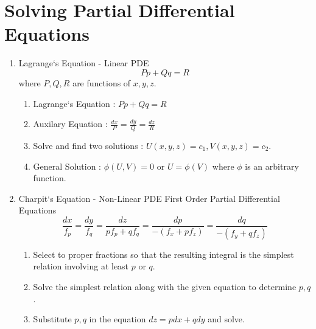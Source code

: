 \section{Solving Partial Differential Equations}
\begin{enumerate}
	\item Lagrange`s Equation - Linear PDE
	\begin{equation}
		Pp + Qq = R
	\end{equation}
		where $P,Q,R$ are functions of $x,y,z$.
	\begin{enumerate}
		\item Lagrange`s Equation : $Pp + Qq = R$
		\item Auxilary Equation : $\frac{dx}{P} = \frac{dy}{Q} = \frac{dz}{R}$
		\item Solve and find two solutions : $U(x,y,z) = c_1, V(x,y,z) = c_2$.
		\item General Solution : $\phi(U,V) = 0$ or $U = \phi(V)$ where $\phi$ is an arbitrary function.
	\end{enumerate}

	\item Charpit`s Equation - Non-Linear PDE First Order Partial Differential Equations\\
	\begin{equation}\frac{dx}{f_p} = \frac{dy}{f_q} = \frac{dz}{pf_p + qf_q} = \frac{dp}{-(f_x + pf_z)} = \frac{dq}{-(f_y+qf_z)}\end{equation}
	\begin{enumerate}
		\item Select to proper fractions so that the resulting integral is the simplest relation involving at least $p$ or $q$.
		\item Solve the simplest relation along with the given equation to determine $p,q$.
		\item Substitute $p,q$ in the equation $dz = pdx + qdy$ and solve.
\end{enumerate}
\end{enumerate}


